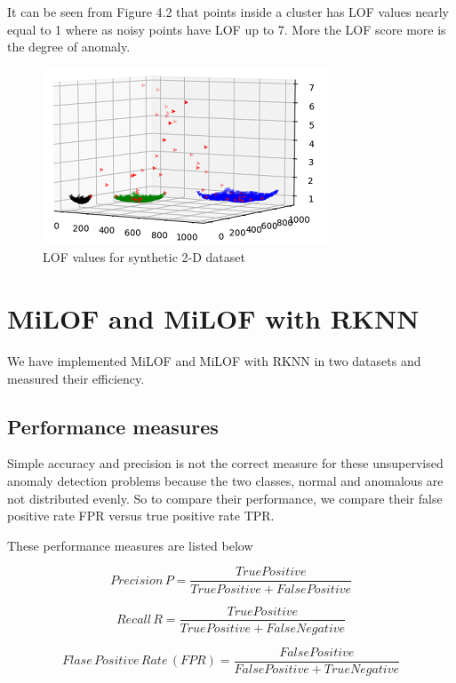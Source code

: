 It can be seen from Figure 4.2 that points inside a cluster has LOF values nearly equal to 1 where as noisy points have LOF up to 7. More the LOF score more is the degree of anomaly.

\begin{figure}[h!]
	\centering
	\includegraphics{chap04/LOF_result.png}
	\caption{LOF values for synthetic 2-D dataset}
\end{figure}


\section{MiLOF and MiLOF with RKNN}

We have implemented MiLOF and MiLOF with RKNN in two datasets and measured their efficiency.

\subsection{Performance measures}
Simple accuracy and precision is not the correct measure for these unsupervised anomaly detection problems because the two classes, normal and anomalous are not distributed evenly. So to compare their performance, we compare their false positive rate FPR versus true positive rate TPR.

These performance measures are listed below


\[  Precision \, P = \frac{True Positive }{True Positive + False Positive} \]

 \[  Recall \,  R = \frac{True Positive }{True Positive + False Negative} \]

\[  Flase \, Positive \, Rate \,  (FPR) = \frac{False Positive }{False Positive + True Negative} \]
\\
\\
